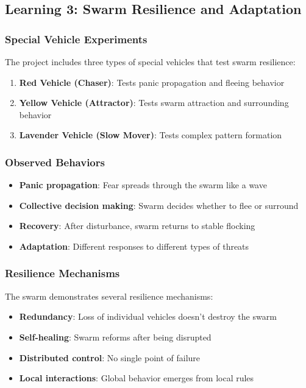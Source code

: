 \documentclass[12pt,a4paper]{article}
\begin{document}
\subsection{Learning 3: Swarm Resilience and Adaptation}

\subsubsection{Special Vehicle Experiments}
The project includes three types of special vehicles that test swarm resilience:

\begin{enumerate}
    \item \textbf{Red Vehicle (Chaser)}: Tests panic propagation and fleeing behavior
    \item \textbf{Yellow Vehicle (Attractor)}: Tests swarm attraction and surrounding behavior
    \item \textbf{Lavender Vehicle (Slow Mover)}: Tests complex pattern formation
\end{enumerate}

\subsubsection{Observed Behaviors}
\begin{itemize}
    \item \textbf{Panic propagation}: Fear spreads through the swarm like a wave
    \item \textbf{Collective decision making}: Swarm decides whether to flee or surround
    \item \textbf{Recovery}: After disturbance, swarm returns to stable flocking
    \item \textbf{Adaptation}: Different responses to different types of threats
\end{itemize}

\subsubsection{Resilience Mechanisms}
The swarm demonstrates several resilience mechanisms:
\begin{itemize}
    \item \textbf{Redundancy}: Loss of individual vehicles doesn't destroy the swarm
    \item \textbf{Self-healing}: Swarm reforms after being disrupted
    \item \textbf{Distributed control}: No single point of failure
    \item \textbf{Local interactions}: Global behavior emerges from local rules
\end{itemize}
\end{document}
